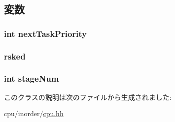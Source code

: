 \subsection{変数}
\hypertarget{classInOrderCPU_1_1StageScheduler_aa5a8d1ca67045a36a1f1417dc12415ae}{
\subsubsection[{nextTaskPriority}]{\setlength{\rightskip}{0pt plus 5cm}int {\bf nextTaskPriority}}}
\label{classInOrderCPU_1_1StageScheduler_aa5a8d1ca67045a36a1f1417dc12415ae}
\hypertarget{classInOrderCPU_1_1StageScheduler_ad30f30216e0eb24192038add1f917975}{
\subsubsection[{rsked}]{ {\bf rsked}}}
\label{classInOrderCPU_1_1StageScheduler_ad30f30216e0eb24192038add1f917975}
\hypertarget{classInOrderCPU_1_1StageScheduler_a9da7aa2f94c428eaed5adad96a6ab151}{
\subsubsection[{stageNum}]{\setlength{\rightskip}{0pt plus 5cm}int {\bf stageNum}}}
\label{classInOrderCPU_1_1StageScheduler_a9da7aa2f94c428eaed5adad96a6ab151}


このクラスの説明は次のファイルから生成されました:\begin{DoxyCompactItemize}
\item 
cpu/inorder/\hyperlink{inorder_2cpu_8hh}{cpu.hh}\end{DoxyCompactItemize}
